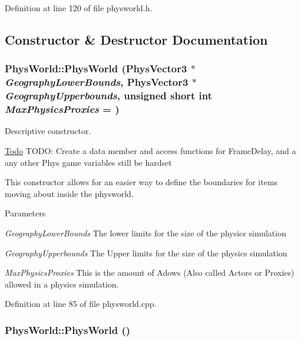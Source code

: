 Definition at line 120 of file physworld.h.

\subsection{Constructor \& Destructor Documentation}
\hypertarget{classPhysWorld_a3228c98369082139722d3c918d735e6c}{
\subsubsection[{PhysWorld}]{\setlength{\rightskip}{0pt plus 5cm}PhysWorld::PhysWorld ({\bf PhysVector3} $\ast$ {\em GeographyLowerBounds}, \/  {\bf PhysVector3} $\ast$ {\em GeographyUpperbounds}, \/  unsigned short int {\em MaxPhysicsProxies} = {})}}
\label{db/df5/classPhysWorld_a3228c98369082139722d3c918d735e6c}


Descriptive constructor. \begin{Desc}
\item[\hyperlink{todo__todo000011}{Todo}]TODO: Create a data member and access functions for FrameDelay, and a any other Phys game variables still be hardset \end{Desc}


This constructor allows for an easier way to define the boundaries for items moving about inside the physworld. 
\begin{DoxyParams}{Parameters}
\item[{\em GeographyLowerBounds}]The lower limits for the size of the physics simulation \item[{\em GeographyUpperbounds}]The Upper limits for the size of the physics simulation \item[{\em MaxPhysicsProxies}]This is the amount of Adows (Also called Actors or Proxies) allowed in a physics simulation. \end{DoxyParams}


Definition at line 85 of file physworld.cpp.\hypertarget{classPhysWorld_a6ded8026b0cd72e7877830698197adf0}{
\subsubsection[{PhysWorld}]{\setlength{\rightskip}{0pt plus 5cm}PhysWorld::PhysWorld ()}}
\label{db/df5/classPhysWorld_a6ded8026b0cd72e7877830698197adf0}


